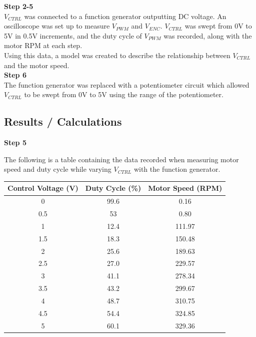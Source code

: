 \documentclass[notitlepage, 12pt]{report}  %
\begin{document}
\textbf{Step 2-5}\\

$V_{CTRL}$ was connected to a function generator outputting DC voltage. An oscilloscope was set up to measure $V_{PWM}$ and $V_{ENC}$. 
$V_{CTRL}$ was swept from 0V to 5V in 0.5V increments, and the duty cycle of $V_{PWM}$ was recorded, along with the motor RPM at each step.\\

Using this data, a model was created to describe the relationship between $V_{CTRL}$ and the motor speed. \\

\textbf{Step 6}\\
The function generator was replaced with a potentiometer circuit which allowed $V_{CTRL}$ to be swept from 0V to 5V using the range 
of the potentiometer. 

\newpage

\subsection*{Results / Calculations}

\indent\indent \textbf{Step 5}

The following is a table containing the data recorded when measuring motor speed and duty cycle while 
varying $V_{CTRL}$ with the function generator.\\


\begin{table}[h!]
    \begin{center}
    \begin{tabular}{c|c|c}
    Control Voltage (V) & Duty Cycle (\%) & Motor Speed (RPM) \\ \hline
    0                   & 99.6            & 0.16              \\
    0.5                 & 53              & 0.80              \\
    1                   & 12.4            & 111.97            \\
    1.5                 & 18.3            & 150.48            \\
    2                   & 25.6            & 189.63            \\
    2.5                 & 27.0            & 229.57            \\
    3                   & 41.1            & 278.34            \\
    3.5                 & 43.2            & 299.67            \\
    4                   & 48.7            & 310.75            \\
    4.5                 & 54.4            & 324.85            \\
    5                   & 60.1            & 329.36           
    \end{tabular}
    \end{center}
\end{table}
\end{document}
